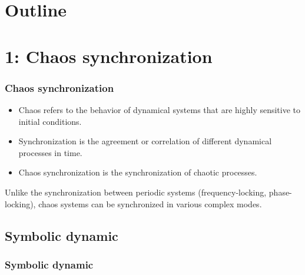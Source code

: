 \documentclass[14pt,handout]{beamer}
\begin{document}
\section*{Outline}
\begin{frame}[shrink] %
\vspace{1cm}
\tableofcontents
\end{frame}

\section{1: Chaos synchronization} %
\begin{frame} \frametitle{Chaos synchronization}
\begin{itemize} %
    \item Chaos refers to the behavior of dynamical systems that are highly sensitive to initial conditions.
    \item Synchronization is the agreement or correlation of different dynamical processes in time.
    \item Chaos synchronization is the synchronization of chaotic processes.
\end{itemize} %
\begin{block}{}
    Unlike the synchronization between periodic systems (frequency-locking, phase-locking), chaos systems can be synchronized in various complex modes.
\end{block}
\end{frame}

\subsection{Symbolic dynamic}
\begin{frame} \frametitle{Symbolic dynamic}
\end{frame}
\end{document}

